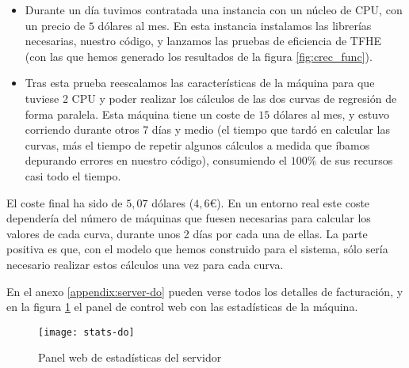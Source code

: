 \begin{itemize}
    \item Durante un día tuvimos contratada una instancia con un núcleo de CPU, con un precio de $5$ dólares al mes.
    En esta instancia instalamos las librerías necesarias, nuestro código, y lanzamos las pruebas de eficiencia de TFHE (con las que hemos generado los resultados de la figura \ref{fig:crec_func}).
    \item Tras esta prueba reescalamos las características de la máquina para que tuviese 2 CPU y poder realizar los cálculos de las dos curvas de regresión de forma paralela. Esta máquina tiene un coste de $15$ dólares al mes, y estuvo corriendo durante otros 7 días y medio (el tiempo que tardó en calcular las curvas, más el tiempo de repetir algunos cálculos a medida que íbamos depurando errores en nuestro código), consumiendo el $100\%$ de sus recursos casi todo el tiempo.
\end{itemize}

El coste final ha sido de $5,07$ dólares ($4,6$\euro). En un entorno real este coste dependería del número de máquinas que fuesen necesarias para calcular los valores de cada curva, durante unos 2 días por cada una de ellas. La parte positiva es que, con el modelo que hemos construido para el sistema, sólo sería necesario realizar estos cálculos una vez para cada curva.

En el anexo \ref{appendix:server-do} pueden verse todos los detalles de facturación, y en la figura \ref{fig:stats-do} el panel de control web con las estadísticas de la máquina.

\begin{figure}[h]
    \texttt{[image: stats-do]}
    \caption{Panel web de estadísticas del servidor}
    \label{fig:stats-do}
\end{figure}
